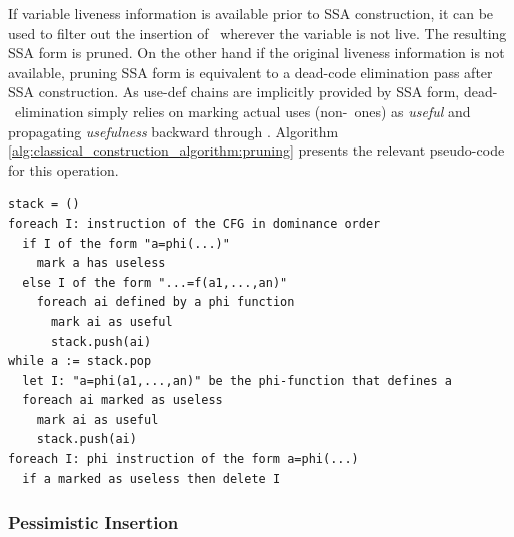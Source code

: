 If variable liveness information is available prior
to SSA construction, it can be used to filter out the 
insertion of \phiops\ wherever the variable is not live.
The resulting SSA form is pruned.
On the other hand
if the original liveness information is not available, 
pruning SSA form is equivalent to a dead-code elimination pass
after SSA construction.
As use-def chains are implicitly provided by SSA form, 
dead-\phiop\ elimination simply relies on marking actual uses 
(non-\phiop\ ones) as \emph{useful} and propagating 
\emph{usefulness} backward through \phiops.
Algorithm \ref{alg:classical_construction_algorithm:pruning} 
presents the relevant pseudo-code for this operation.

\begin{algorithm}
\begin{verbatim}
stack = ()
foreach I: instruction of the CFG in dominance order
  if I of the form "a=phi(...)"
    mark a has useless
  else I of the form "...=f(a1,...,an)"
    foreach ai defined by a phi function
      mark ai as useful
      stack.push(ai)
while a := stack.pop
  let I: "a=phi(a1,...,an)" be the phi-function that defines a
  foreach ai marked as useless
    mark ai as useful
    stack.push(ai)
foreach I: phi instruction of the form a=phi(...)
  if a marked as useless then delete I  
\end{verbatim}
\label{alg:classical_construction_algorithm:pruning}
\end{algorithm}

\subsubsection*{Pessimistic \phiop Insertion}

